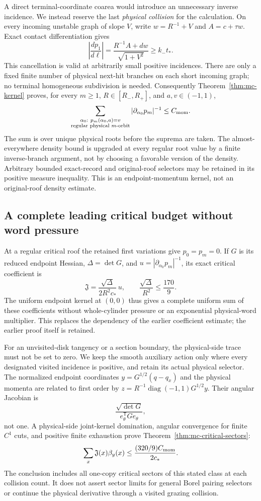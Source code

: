 \documentclass[11pt,reqno]{amsart}
\numberwithin{equation}{section}
\theoremstyle{definition}\newtheorem{definition}[theorem]{Definition}
\theoremstyle{remark}\newtheorem{remark}[theorem]{Remark}
\begin{document}
A direct terminal-coordinate coarea would introduce an unnecessary
inverse incidence. We instead reserve the last \emph{physical collision}
for the calculation. On every incoming unstable graph of slope $V$,
write $w=R^{-1}+V$ and $A=c+\tau w$. Exact contact differentiation gives
\[
 \left|\frac{dp_1}{d\ell}\right|
       =\frac{R^{-1}A+dw}{\sqrt{1+V^2}}
       \ge k_-t_*.
\]
This cancellation is valid at arbitrarily small positive incidences.
There are only a fixed finite number of physical next-hit branches on
each short incoming graph; no terminal homogeneous subdivision is needed.
Consequently Theorem~\ref{thm:mc-kernel} proves, for every $m\ge1$,
$R\in[R_-,R_+]$, and $a,v\in(-1,1)$,
\[
 \sum_{\substack{\alpha_0:\ p_m(\alpha_0,a)=v\\
                         \text{regular physical }m\text{-orbit}}}
       |\partial_{\alpha_0}p_m|^{-1}\le C_{\rm mom}.
\]
The sum is over unique physical roots before the suprema are taken.
The almost-everywhere density bound is upgraded at every regular root
value by a finite inverse-branch argument, not by choosing a favorable
version of the density. Arbitrary bounded exact-record and original-roof
selectors may be retained in its positive measure inequality. This is
an endpoint-momentum kernel, not an original-roof density estimate.

\subsection*{A complete leading critical budget without word pressure}
At a regular critical roof the retained first variations give
$p_0=p_m=0$. If $G$ is its reduced endpoint Hessian, $\Delta=\det G$,
and $u=|\partial_{\alpha_0}p_m|^{-1}$, its exact critical coefficient is
\[
 \mathfrak J=\frac{\sqrt\Delta}{2R^2c_*}\,u,
 \qquad \frac{\sqrt\Delta}{R^2}\le\frac{170}{9}.
\]
The uniform endpoint kernel at $(0,0)$ thus gives a complete uniform
sum of these coefficients without whole-cylinder pressure or an
exponential physical-word multiplier. This replaces the dependency of
the earlier coefficient estimate; the earlier proof itself is retained.

For an unvisited-disk tangency or a section boundary, the physical-side
trace must not be set to zero. We keep the smooth auxiliary action only
where every designated visited incidence is positive, and retain its
actual physical selector. The normalized endpoint coordinates
$y=G^{1/2}(q-q_x)$ and the physical momenta are related to first order by
$z=R^{-1}\operatorname{diag}(-1,1)G^{1/2}y$. Their angular Jacobian is
\[
 \frac{\sqrt{\det G}}{e_\theta^{\mathsf T}G e_\theta},
\]
not one. A physical-side joint-kernel domination, angular convergence for
finite $C^1$ cuts, and positive finite exhaustion prove
Theorem~\ref{thm:mc-critical-sectors}:
\[
 \sum_x\mathfrak J(x)\beta_y(x)
                    \le\frac{(320/9)C_{\rm mom}}{2c_*}.
\]
The conclusion includes all one-copy critical sectors of this stated
class at each collision count. It does not assert sector limits for
general Borel pairing selectors or continue the physical derivative
through a visited grazing collision.
\end{document}

